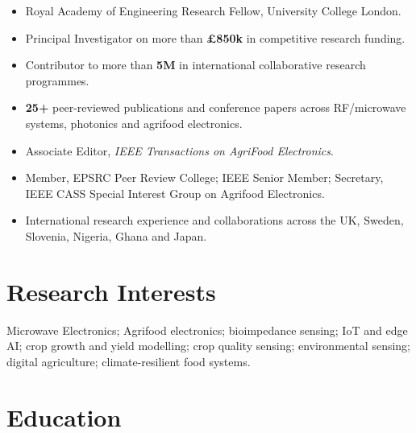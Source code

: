 \documentclass[a4paper,11pt]{article}
\begin{document}
\begin{itemize}
    \item Royal Academy of Engineering Research Fellow, University College London.
    \item Principal Investigator on more than \textbf{\pounds850k} in competitive research funding.
    \item Contributor to more than \textbf{\texteuro5M} in international collaborative research programmes.
    \item \textbf{25+} peer-reviewed publications and conference papers across RF/microwave systems, photonics and agrifood electronics.
    \item Associate Editor, \emph{IEEE Transactions on AgriFood Electronics}.
    \item Member, EPSRC Peer Review College; IEEE Senior Member; Secretary, IEEE CASS Special Interest Group on Agrifood Electronics.
    \item International research experience and collaborations across the UK, Sweden, Slovenia, Nigeria, Ghana and Japan.
\end{itemize}


\section{Research Interests}

Microwave Electronics; Agrifood electronics; bioimpedance sensing; IoT and edge AI; crop growth and yield modelling; crop quality sensing; environmental sensing; digital agriculture; climate-resilient food systems.


\section{Education}
\end{document}
